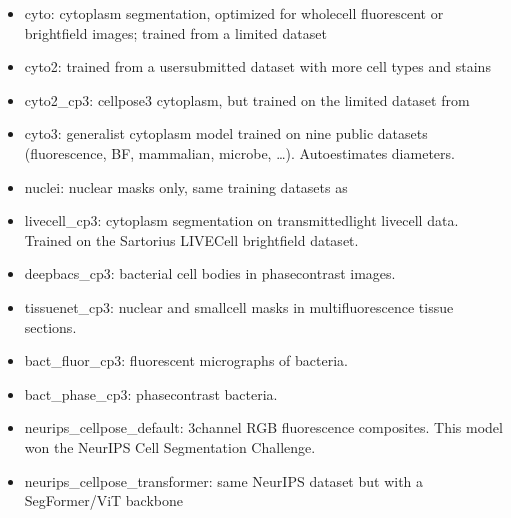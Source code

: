 \documentclass[letterpaper,10pt,english]{jupyterBook}
\begin{document}
\begin{itemize}
\item {} 
\sphinxAtStartPar
cyto: cytoplasm segmentation, optimized for whole\sphinxhyphen{}cell fluorescent or bright\sphinxhyphen{}field images; trained from a limited dataset

\item {} 
\sphinxAtStartPar
cyto2: trained from a user\sphinxhyphen{}submitted dataset with more cell types and stains

\item {} 
\sphinxAtStartPar
cyto2\_cp3: cellpose3 cytoplasm, but trained on the limited dataset from 

\item {} 
\sphinxAtStartPar
cyto3: generalist cytoplasm model trained on nine public datasets (fluorescence, BF, mammalian, microbe, …). Auto\sphinxhyphen{}estimates diameters.

\item {} 
\sphinxAtStartPar
nuclei: nuclear masks only, same training datasets as 

\item {} 
\sphinxAtStartPar
livecell\_cp3: cytoplasm segmentation on transmitted\sphinxhyphen{}light live\sphinxhyphen{}cell data. Trained on the Sartorius LIVECell bright\sphinxhyphen{}field dataset.

\item {} 
\sphinxAtStartPar
deepbacs\_cp3: bacterial cell bodies in phase\sphinxhyphen{}contrast images.

\item {} 
\sphinxAtStartPar
tissuenet\_cp3: nuclear and small\sphinxhyphen{}cell masks in multi\sphinxhyphen{}fluorescence tissue sections.

\item {} 
\sphinxAtStartPar
bact\_fluor\_cp3: fluorescent micrographs of bacteria.

\item {} 
\sphinxAtStartPar
bact\_phase\_cp3: phase\sphinxhyphen{}contrast bacteria.

\item {} 
\sphinxAtStartPar
neurips\_cellpose\_default: 3\sphinxhyphen{}channel RGB fluorescence composites. This model won the NeurIPS Cell Segmentation Challenge.

\item {} 
\sphinxAtStartPar
neurips\_cellpose\_transformer: same NeurIPS dataset but with a SegFormer/ViT backbone


\end{itemize}
\end{document}
